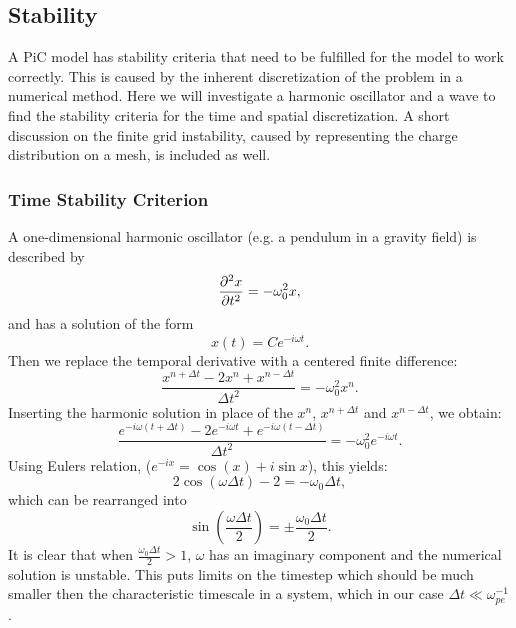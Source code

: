 \subsection{Stability}
    \label{sec:stability}
    A PiC model has stability criteria that need to be fulfilled
    for the model to work correctly. This is caused by the inherent discretization of the problem
    in a numerical method. Here we will investigate a harmonic oscillator and a
    wave to find the stability criteria for the time and spatial discretization.
	A short discussion on the finite grid instability, caused by representing the
 	charge distribution on a mesh, is included as well.

    \subsubsection{Time Stability Criterion}
        \label{sec:time_stability}
        A one-dimensional harmonic oscillator (e.g. a pendulum in a gravity field) is described by
        \begin{equation}
            \pdv[2]{x}{t} = - \omega_0^2 x,
        \end{equation}
        and has a solution of the form
        \begin{equation}
            x(t) = C e^{-i\omega t} \label{eq:harmonic_sol}.
        \end{equation}
        Then we replace the temporal derivative with a centered finite difference:
        \begin{equation}
            \frac{x^{n+\Delta t} - 2 x^{n} + x^{n-\Delta t}}{\Delta t^2} = -\omega_0^2 x^n.
        \end{equation}
        Inserting the harmonic solution in place of the \(x^n\), \(x^{n+ \Delta t}\) and \(x^{n-\Delta t}\), we obtain:
        \begin{equation}
            \frac{ e^{-i\omega (t + \Delta t)} -2e^{-i\omega t} + e^{-i\omega (t - \Delta t)}}{\Delta t^2} = -\omega_0^2 e^{-i\omega t}.
        \end{equation}
        Using Eulers relation, (\(e^{-ix} = \cos(x) + i\sin{x}\)), this yields:
        \begin{equation}
            2\cos(\omega \Delta t)- 2 = -\omega_0 \Delta t,
        \end{equation}
        which can be rearranged into
        \begin{equation}
                \sin(\frac{\omega \Delta t}{2}) = \pm \frac{\omega_0 \Delta t}{2}.
        \end{equation}
        It is clear that when \(\frac{\omega_0 \Delta t}{2} > 1\), \(\omega\) has an imaginary component
        and the numerical solution is unstable. This puts limits on the timestep which should be much smaller then
		the characteristic timescale in a system, which in our case \(\Delta t \ll \omega_{pe}^{-1}\).

